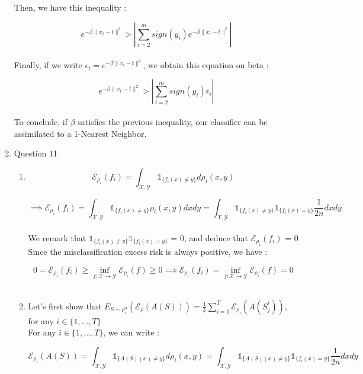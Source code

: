 \documentclass[final,3p,times,12pt]{article}
\begin{document}
\begin{enumerate}
Then, we have this inequality : 

\[ e^{-\beta\lVert x_1-t \rVert^{2}} > | \sum_{i=2}^m sign(y_i)e^{-\beta \lVert x_i-t \rVert^{2}}|
\]\\

Finally, if we write $\epsilon_i = e^{-\beta \lVert x_i-t \rVert^2}$, we obtain this equation on beta : 

\[ e^{-\beta\lVert x_1-t \rVert^{2}} > | \sum_{i=2}^m sign(y_i)\epsilon_i|
\]\\

To conclude, if $\beta$ satisfies the previous inequality, our classifier can be assimilated to a 1-Nearest Neighbor.\\

    \item Question 11
    \begin{enumerate}
        \item 
 \[\mathcal{E}_{\rho_i}(f_i) = \int_{\mathcal{X, Y}} \mathbb{1}_{ \{f_i(x) \neq y\} } d\rho_i(x, y)\]

\[ \implies
\mathcal{E}_{\rho_i}(f_i) = \int_{\mathcal{X, Y}} \mathbb{1}_{ \{f_i(x) \neq y\} } \rho_i(x, y) dxdy = \int_{\mathcal{X, Y}} \mathbb{1}_{\{f_i(x) \neq y\} } \mathbb{1}_{\{f_i(x) = y\}} \frac{1}{2n} dxdy
\]\\

We remark that $\mathbb{1}_{ \{f_i(x) \neq y\} } \mathbb{1}_{\{f_i(x) = y\}}$ = 0, and deduce that $\mathcal{E}_{\rho_i}(f_i)$ = 0 \\

Since the misclassification excess risk is always positive, we have : 

\[ 0= \mathcal{E}_{\rho_i}(f_i) \geq \inf_{f : \mathcal{X} \rightarrow \mathcal{Y}} \mathcal{E}_{\rho_i}(f) \geq 0 \implies \mathcal{E}_{\rho_i}(f_i) = \inf_{f : \mathcal{X} \rightarrow \mathcal{Y}} \mathcal{E}_{\rho_i}(f) = 0
\]\\

\item

Let's first show that $ E_{S \sim \rho_i^n}(\mathcal{E}_{\rho}(A(S))) = \frac{1}{k}\sum_{i=1}^{T} \mathcal{E}_{\rho_i}(A(S_j^i))$, for any $i \in \{1, ..., T\}$\\

For any $i \in \{1, ..., T\}$, we can write :

\[
\mathcal{E}_{\rho_i}(A(S)) = \int_{\mathcal{X}, \mathcal{Y}} \mathbb{1}_{\{A(S)(x)\neq y\}} d\rho_i(x,y) = \int_{\mathcal{X}, \mathcal{Y}} \mathbb{1}_{\{A(S)(x)\neq y\}} \mathbb{1}_{\{f_i(x) = y\}} \frac{1}{2n}dxdy
\]\\


\end{enumerate}
\end{enumerate}
\end{document}
